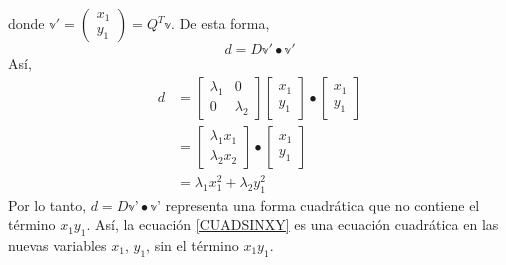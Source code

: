 donde $\mathbb{v}' = \begin{pmatrix} x_1 \\ y_1 \end{pmatrix} = Q^T \mathbb{v}$. De esta forma,
\begin{equation}
    d = D \mathbb{v}' \bullet \mathbb{v}' \label{CUADSINXY}
\end{equation}
Así,
\begin{align*}
    d & = \begin{bmatrix}
        \lambda_1 & 0 \\
        0 & \lambda_2
    \end{bmatrix} \begin{bmatrix}
        x_1 \\
        y_1 
    \end{bmatrix} \bullet \begin{bmatrix}
        x_1 \\
        y_1
    \end{bmatrix} \\
    & = \begin{bmatrix}
        \lambda_1 x_1 \\
        \lambda_2 x_2
    \end{bmatrix} \bullet \begin{bmatrix}
        x_1 \\
        y_1
    \end{bmatrix} \\
    & = \lambda_1 x_1^2 + \lambda_2 y_1^2
\end{align*}
Por lo tanto, $d = D \mathbb{v}’ \bullet \mathbb{v}’$ representa una forma cuadrática que no contiene el término $x_1y_1$. Así, la ecuación \eqref{CUADSINXY} es una ecuación cuadrática en las nuevas variables $x_1$, $y_1$, sin el término $x_1y_1$.


